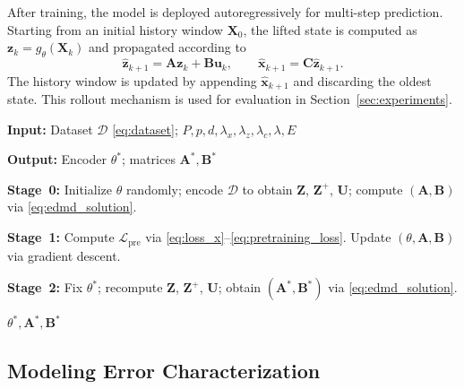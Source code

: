 \documentclass[journal]{IEEEtran}
\newcommand{\vx}{\mathbf{x}}
\newcommand{\vu}{\mathbf{u}}
\newcommand{\vz}{\mathbf{z}}
\newcommand{\mA}{\mathbf{A}}
\newcommand{\mB}{\mathbf{B}}
\newcommand{\mC}{\mathbf{C}}
\newcommand{\mX}{\mathbf{X}}
\newcommand{\mZ}{\mathbf{Z}}
\newcommand{\mU}{\mathbf{U}}
\begin{document}
After training, the model is deployed autoregressively for multi-step
prediction. Starting from an initial history window $\mX_0$, the lifted
state is computed as $\vz_k = g_\theta(\mX_k)$ and propagated according
to
\begin{equation}
    \hat{\vz}_{k+1} = \mA \vz_k + \mB \vu_k, \qquad
    \hat{\vx}_{k+1} = \mC \hat{\vz}_{k+1}.
\end{equation}
The history window is updated by appending $\hat{\vx}_{k+1}$ and
discarding the oldest state. This rollout mechanism is used for
evaluation in Section~\ref{sec:experiments}.

\begin{algorithm}[!t]
\caption{Transformer-Koopman Training Algorithm}
\label{alg:training}
\begin{algorithmic}[1]

\STATE \textbf{Input:} Dataset $\mathcal{D}$ \eqref{eq:dataset};
$P, p, d, \lambda_x, \lambda_z, \lambda_c, \lambda, E$

\STATE \textbf{Output:} Encoder $\theta^{*}$; matrices $\mA^{*}, \mB^{*}$

\STATE \textbf{Stage~0:}
Initialize $\theta$ randomly; encode $\mathcal{D}$ to obtain
$\mZ$, $\mZ^{+}$, $\mU$; compute $(\mA,\mB)$ via
\eqref{eq:edmd_solution}.

\vspace{2pt}

\STATE \textbf{Stage~1:}
        \STATE Compute $\mathcal{L}_{\mathrm{pre}}$
               via \eqref{eq:loss_x}--\eqref{eq:pretraining_loss}.
        \STATE Update $(\theta, \mA, \mB)$ via gradient descent.
    \ENDFOR
\ENDFOR

\vspace{2pt}

\STATE \textbf{Stage~2:}
Fix $\theta^{*}$; recompute $\mZ$, $\mZ^{+}$, $\mU$;
obtain $(\mA^{*}, \mB^{*})$ via \eqref{eq:edmd_solution}.

\RETURN $\theta^{*}, \mA^{*}, \mB^{*}$

\end{algorithmic}
\end{algorithm}

\subsection{Modeling Error Characterization}
\label{subsec:modeling_error}
\end{document}
